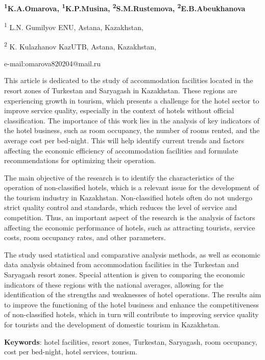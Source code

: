 {\bfseries \textsuperscript{1}K.A.Omarova\textsuperscript{\envelope },
\textsuperscript{1}K.P.Musina, \textsuperscript{2}S.M.Rustemova,
\textsuperscript{2}E.B.Abeukhanova}

\textsuperscript{1} L.N. Gumilyov ENU, Astana, Kazakhstan,

\textsuperscript{2} K. Kulazhanov KazUTB, Astana, Kazakhstan,

e-mail:omarova820204@mail.ru

This article is dedicated to the study of accommodation facilities
located in the resort zones of Turkestan and Saryagash in Kazakhstan.
These regions are experiencing growth in tourism, which presents a
challenge for the hotel sector to improve service quality, especially in
the context of hotels without official classification. The importance of
this work lies in the analysis of key indicators of the hotel business,
such as room occupancy, the number of rooms rented, and the average cost
per bed-night. This will help identify current trends and factors
affecting the economic efficiency of accommodation facilities and
formulate recommendations for optimizing their operation.

The main objective of the research is to identify the characteristics of
the operation of non-classified hotels, which is a relevant issue for
the development of the tourism industry in Kazakhstan. Non-classified
hotels often do not undergo strict quality control and standards, which
reduces the level of service and competition. Thus, an important aspect
of the research is the analysis of factors affecting the economic
performance of hotels, such as attracting tourists, service costs, room
occupancy rates, and other parameters.

The study used statistical and comparative analysis methods, as well as
economic data analysis obtained from accommodation facilities in the
Turkestan and Saryagash resort zones. Special attention is given to
comparing the economic indicators of these regions with the national
averages, allowing for the identification of the strengths and
weaknesses of hotel operations. The results aim to improve the
functioning of the hotel business and enhance the competitiveness of
non-classified hotels, which in turn will contribute to improving
service quality for tourists and the development of domestic tourism in
Kazakhstan.

{\bfseries Keywords}: hotel facilities, resort zones, Turkestan, Saryagash,
room occupancy, cost per bed-night, hotel services, tourism.

